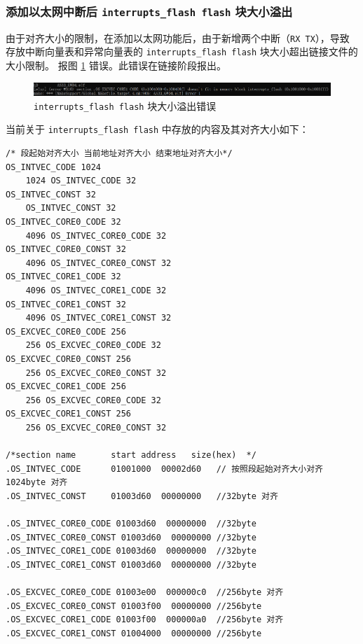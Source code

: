 \subsubsection{添加以太网中断后 \lstinline{interrupts_flash flash} 块大小溢出}\label{subsubsec:eth_ld_interrupts_flash_overflow_error}

由于对齐大小的限制，在添加以太网功能后，由于新增两个中断（\lstinline{RX TX}），导致存放中断向量表和异常向量表的 \lstinline{interrupts_flash flash} 块大小超出链接文件的大小限制。
报图 \ref{fig:eth_ld_error_interrupts_flash_overflow} 错误。此错误在链接阶段报出。

\begin{figure}[htbp]
    \centering
    \includegraphics[scale=0.6]{pic/eth_ld_error_interrupts_flash_overflow.png}
    \caption{\lstinline{interrupts_flash flash} 块大小溢出错误}
    \label{fig:eth_ld_error_interrupts_flash_overflow}
\end{figure}

当前关于 \lstinline{interrupts_flash flash} 中存放的内容及其对齐大小如下：

\begin{lstlisting}
/* 段起始对齐大小 当前地址对齐大小 结束地址对齐大小*/
OS_INTVEC_CODE 1024
	1024 OS_INTVEC_CODE 32
OS_INTVEC_CONST 32
	OS_INTVEC_CONST 32
OS_INTVEC_CORE0_CODE 32
	4096 OS_INTVEC_CORE0_CODE 32
OS_INTVEC_CORE0_CONST 32
	4096 OS_INTVEC_CORE0_CONST 32
OS_INTVEC_CORE1_CODE 32
	4096 OS_INTVEC_CORE1_CODE 32
OS_INTVEC_CORE1_CONST 32
	4096 OS_INTVEC_CORE1_CONST 32
OS_EXCVEC_CORE0_CODE 256
	256 OS_EXCVEC_CORE0_CODE 32
OS_EXCVEC_CORE0_CONST 256
	256 OS_EXCVEC_CORE0_CONST 32	
OS_EXCVEC_CORE1_CODE 256
	256 OS_EXCVEC_CORE0_CODE 32
OS_EXCVEC_CORE1_CONST 256
	256 OS_EXCVEC_CORE0_CONST 32	

/*section name       start address   size(hex)  */
.OS_INTVEC_CODE      01001000  00002d60   // 按照段起始对齐大小对齐 1024byte 对齐
.OS_INTVEC_CONST     01003d60  00000000   //32byte 对齐

.OS_INTVEC_CORE0_CODE 01003d60  00000000  //32byte
.OS_INTVEC_CORE0_CONST 01003d60  00000000 //32byte
.OS_INTVEC_CORE1_CODE 01003d60  00000000  //32byte
.OS_INTVEC_CORE1_CONST 01003d60  00000000 //32byte
  
.OS_EXCVEC_CORE0_CODE 01003e00  000000c0  //256byte 对齐
.OS_EXCVEC_CORE0_CONST 01003f00  00000000 //256byte
.OS_EXCVEC_CORE1_CODE 01003f00  000000a0  //256byte 对齐
.OS_EXCVEC_CORE1_CONST 01004000  00000000 //256byte
\end{lstlisting}

